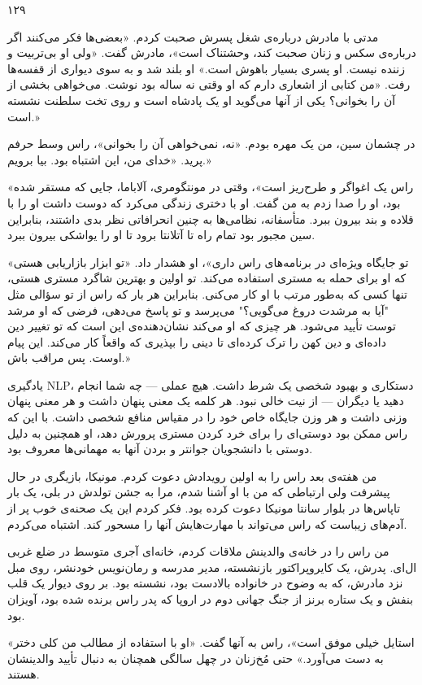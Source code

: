 ۱۲۹

مدتی با مادرش درباره‌ی شغل پسرش صحبت کردم. «بعضی‌ها فکر می‌کنند اگر درباره‌ی سکس و زنان صحبت کند، وحشتناک است»، مادرش گفت. «ولی او بی‌تربیت و زننده نیست. او پسری بسیار باهوش است.» او بلند شد و به سوی دیواری از قفسه‌ها رفت. «من کتابی از اشعاری دارم که او وقتی نه ساله بود نوشت. می‌خواهی بخشی از آن را بخوانی؟ یکی از آنها می‌گوید او یک پادشاه است و روی تخت سلطنت نشسته است.»

در چشمان سین، من یک مهره بودم. «نه، نمی‌خواهی آن را بخوانی»، راس وسط حرفم پرید. «خدای من، این اشتباه بود. بیا برویم.»

«راس یک اغواگر و طرح‌ریز است»، وقتی در مونتگومری، آلاباما، جایی که مستقر شده بود، او را صدا زدم به من گفت. او با دختری زندگی می‌کرد که دوست داشت او را با قلاده و بند بیرون ببرد. متأسفانه، نظامی‌ها به چنین انحرافاتی نظر بدی داشتند، بنابراین سین مجبور بود تمام راه تا آتلانتا برود تا او را یواشکی بیرون ببرد.

«تو جایگاه ویژه‌ای در برنامه‌های راس داری»، او هشدار داد. «تو ابزار بازاریابی هستی که او برای حمله به مستری استفاده می‌کند. تو اولین و بهترین شاگرد مستری هستی، تنها کسی که به‌طور مرتب با او کار می‌کنی. بنابراین هر بار که راس از تو سؤالی مثل "آیا به مرشدت دروغ می‌گویی؟" می‌پرسد و تو پاسخ می‌دهی، فرضی که او مرشد توست تأیید می‌شود. هر چیزی که او می‌کند نشان‌دهنده‌ی این است که تو تغییر دین داده‌ای و دین کهن را ترک کرده‌ای تا دینی را بپذیری که واقعاً کار می‌کند. این پیام اوست. پس مراقب باش.»

یادگیری NLP، دستکاری و بهبود شخصی یک شرط داشت. هیچ عملی — چه شما انجام دهید یا دیگران — از نیت خالی نبود. هر کلمه یک معنی پنهان داشت و هر معنی پنهان وزنی داشت و هر وزن جایگاه خاص خود را در مقیاس منافع شخصی داشت. با این که راس ممکن بود دوستی‌ای را برای خرد کردن مستری پرورش دهد، او همچنین به دلیل دوستی با دانشجویان جوانتر و بردن آنها به مهمانی‌ها معروف بود.

من هفته‌ی بعد راس را به اولین رویدادش دعوت کردم. مونیکا، بازیگری در حال پیشرفت ولی ارتباطی که من با او آشنا شدم، مرا به جشن تولدش در بلی، یک بار تاپاس‌ها در بلوار سانتا مونیکا دعوت کرده بود. فکر کردم این یک صحنه‌ی خوب پر از آدم‌های زیباست که راس می‌تواند با مهارت‌هایش آنها را مسحور کند. اشتباه می‌کردم.

من راس را در خانه‌ی والدینش ملاقات کردم، خانه‌ای آجری متوسط در ضلع غربی ال‌ای. پدرش، یک کایروپراکتور بازنشسته، مدیر مدرسه و رمان‌نویس خودنشر، روی مبل نزد مادرش، که به وضوح در خانواده بالادست بود، نشسته بود. بر روی دیوار یک قلب بنفش و یک ستاره برنز از جنگ جهانی دوم در اروپا که پدر راس برنده شده بود، آویزان بود.

«استایل خیلی موفق است»، راس به آنها گفت. «او با استفاده از مطالب من کلی دختر به دست می‌آورد.» حتی مُخ‌زنان در چهل سالگی همچنان به دنبال تأیید والدینشان هستند.